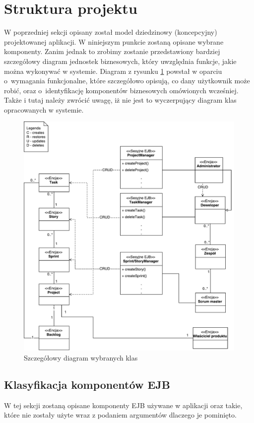 \section{Struktura projektu}
W poprzedniej sekcji opisany został model dziedzinowy (koncepcyjny) projektowanej aplikacji. W niniejszym punkcie zostaną opisane wybrane komponenty. Zanim jednak to zrobimy zostanie przedstawiony bardziej szczegółowy diagram jednostek biznesowych, który uwzględnia funkcje, jakie można wykonywać w systemie. Diagram z rysunku \ref{fig:diagdetailuml} powstał w oparciu o~wymagania funkcjonalne, które szczegółowo opisują, co dany użytkownik może robić, oraz o~identyfikację komponentów biznesowych omówionych wcześniej. Także i tutaj należy zwrócić uwagę, iż nie jest to wyczerpujący diagram klas opracowanych w systemie.
\begin{figure}[h!]
	\centering
	\includegraphics[width=15cm]{rysunki/diagdetailuml.pdf}	
	\caption{Szczegółowy diagram wybranych klas}
	\label{fig:diagdetailuml}
\end{figure}

\subsection{Klasyfikacja komponentów EJB}
W tej sekcji zostaną opisane komponenty EJB używane w aplikacji oraz takie, które nie zostały użyte wraz z podaniem argumentów dlaczego je pominięto.

